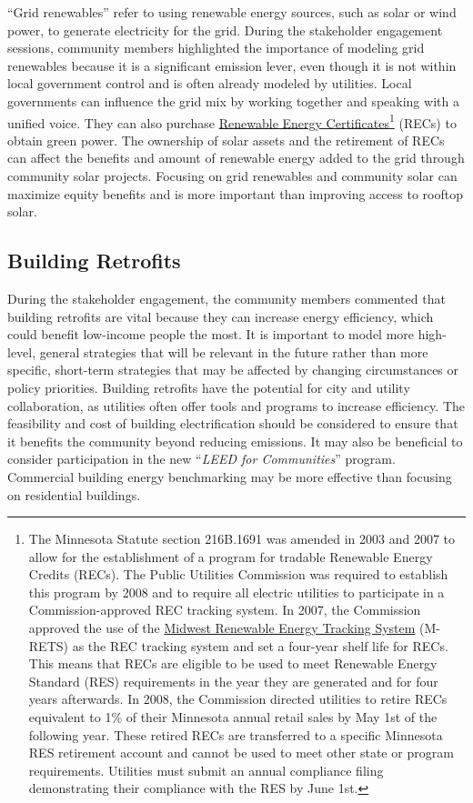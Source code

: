 \documentclass[
]{book}
\begin{document}
``Grid renewables'' refer to using renewable energy sources, such as solar or wind power, to generate electricity for the grid. During the stakeholder engagement sessions, community members highlighted the importance of modeling grid renewables because it is a significant emission lever, even though it is not within local government control and is often already modeled by utilities. Local governments can influence the grid mix by working together and speaking with a unified voice. They can also purchase \href{https://www.leg.mn.gov/docs/2019/mandated/190330.pdf}{Renewable Energy Certificates}\footnote{The Minnesota Statute section 216B.1691 was amended in 2003 and 2007 to allow for the establishment of a program for tradable Renewable Energy Credits (RECs). The Public Utilities Commission was required to establish this program by 2008 and to require all electric utilities to participate in a Commission-approved REC tracking system. In 2007, the Commission approved the use of the \href{https://www.mrets.org/}{Midwest Renewable Energy Tracking System} (M-RETS) as the REC tracking system and set a four-year shelf life for RECs. This means that RECs are eligible to be used to meet Renewable Energy Standard (RES) requirements in the year they are generated and for four years afterwards. In 2008, the Commission directed utilities to retire RECs equivalent to 1\% of their Minnesota annual retail sales by May 1st of the following year. These retired RECs are transferred to a specific Minnesota RES retirement account and cannot be used to meet other state or program requirements. Utilities must submit an annual compliance filing demonstrating their compliance with the RES by June 1st.} (RECs) to obtain green power. The ownership of solar assets and the retirement of RECs can affect the benefits and amount of renewable energy added to the grid through community solar projects. Focusing on grid renewables and community solar can maximize equity benefits and is more important than improving access to rooftop solar.

\hypertarget{building-retrofits}{%
\subsection{Building Retrofits}\label{building-retrofits}}

During the stakeholder engagement, the community members commented that building retrofits are vital because they can increase energy efficiency, which could benefit low-income people the most. It is important to model more high-level, general strategies that will be relevant in the future rather than more specific, short-term strategies that may be affected by changing circumstances or policy priorities. Building retrofits have the potential for city and utility collaboration, as utilities often offer tools and programs to increase efficiency. The feasibility and cost of building electrification should be considered to ensure that it benefits the community beyond reducing emissions. It may also be beneficial to consider participation in the new ``\emph{LEED for Communities}'' program. Commercial building energy benchmarking may be more effective than focusing on residential buildings.
\end{document}
